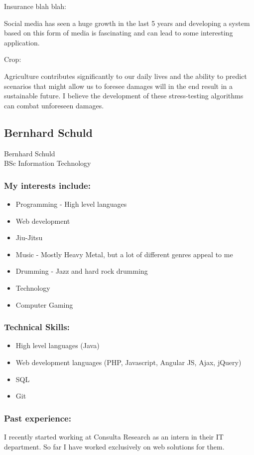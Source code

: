 \documentclass{article}
\begin{document}
	Insurance blah blah:
	
	Social media has seen a huge growth in the last 5 years and developing a system based on this form of media is fascinating and can lead to some interesting application.
	
	Crop:
	
	Agriculture contributes significantly to our daily lives and the ability to predict scenarios that might allow us to foresee damages will in the end result in a sustainable future. I believe the development of these stress-testing algorithms can combat unforeseen damages.
	
	
	
	\subsection{Bernhard Schuld}
	Bernhard Schuld \\
	BSc Information Technology
	\subsubsection{My interests include:}
	\begin{itemize}
		\item Programming - High level languages
		\item Web development
		\item Jiu-Jitsu
		\item Music - Mostly Heavy Metal, but a lot of different genres appeal to me
		\item Drumming - Jazz and hard rock drumming
		\item Technology
		\item Computer Gaming		
	\end{itemize}
	\subsubsection{Technical Skills:}
	\begin{itemize}
		\item High level languages (Java)
		\item Web development languages (PHP, Javascript, Angular JS, Ajax, jQuery)
		\item SQL
		\item Git
	\end{itemize}
	\subsubsection{Past experience:}
		I recently started working at Consulta Research as an intern in their IT department. So far I have worked exclusively on web solutions for them.
\end{document}
